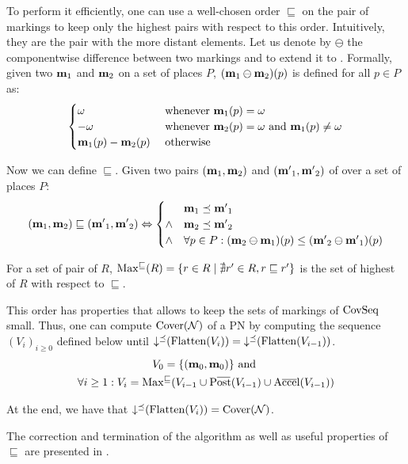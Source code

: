 To perform it efficiently, one can use a well-chosen order $\sqsubseteq$ on the pair of markings to keep only the highest pairs with respect to this order.
Intuitively, they are the pair with the more distant elements.
Let us denote by $\ominus$ the componentwise difference between two markings and to extend it to \omarks.
Formally, given two \omarks $\mathbf{m}_1$ and $\mathbf{m}_2$ on a set of places $P$, $(\mathbf{m}_1 \ominus \mathbf{m}_2)(p)$ is defined for all $p \in P$ as:
\[
  \begin{cases}
    \omega & \text{ whenever } \mathbf{m}_1(p) = \omega \\
    -\omega & \text{ whenever } \mathbf{m}_2(p) = \omega \text{ and } \mathbf{m}_1(p) \neq \omega \\
    \mathbf{m}_1(p) - \mathbf{m}_2(p) & \text{ otherwise}
  \end{cases}
\]

Now we can define $\sqsubseteq$.
Given two pairs $(\mathbf{m}_1, \mathbf{m}_2)$ and $(\mathbf{m'}_1, \mathbf{m'}_2)$ of \omarks over a set of places $P$:
\[
  (\mathbf{m}_1, \mathbf{m}_2) \sqsubseteq (\mathbf{m'}_1, \mathbf{m'}_2) \Leftrightarrow
  \begin{cases}
    & \mathbf{m}_1 \preceq \mathbf{m'}_1 \\
    \wedge & \mathbf{m}_2 \preceq \mathbf{m'}_2 \\
    \wedge & \forall p \in P : (\mathbf{m}_2 \ominus \mathbf{m}_1)(p) \leq (\mathbf{m'}_2 \ominus \mathbf{m'}_1)(p)
  \end{cases}
\]

For a set of pair of \omarks $R$, $\operatorname{Max^\sqsubseteq}(R) = \{ r \in R \mid \nexists r' \in R, r \sqsubseteq r'\}$ is the set of highest \omark of $R$ with respect to $\sqsubseteq$.

This order has properties \citep{Geeraerts07} that allows to keep the sets of markings of $\operatorname{CovSeq}$ small.
Thus, one can compute $\operatorname{Cover}(\mathcal{N})$ of a \ac{PN} \NPTm by computing the sequence $(V_i)_{i \geq 0}$ defined below until $\operatorname{\downarrow^\preceq}(\operatorname{Flatten}(V_i)) = \operatorname{\downarrow^\preceq}(\operatorname{Flatten}(V_{i-1}))$.
\begin{gather*}
  V_0 = \{(\marqi, \marqi)\} \text{ and } \\
  \forall i \geq 1 : V_i = \maxs(V_{i-1} \cup \Postb(V_{i-1}) \cup \Accelb(V_{i-1}))
\end{gather*}

At the end, we have that $\operatorname{\downarrow^\preceq}(\operatorname{Flatten}(V_i)) = \operatorname{Cover}(\mathcal{N})$.

The correction and termination of the algorithm as well as useful properties of $\sqsubseteq$ are presented in \cite{Geeraerts07, Ganty09}.

